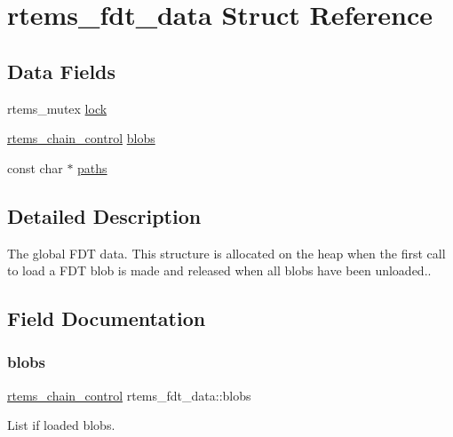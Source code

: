 \hypertarget{structrtems__fdt__data}{}\section{rtems\+\_\+fdt\+\_\+data Struct Reference}
\label{structrtems__fdt__data}
\subsection*{Data Fields}
\begin{DoxyCompactItemize}
\item 
rtems\+\_\+mutex \mbox{\hyperlink{structrtems__fdt__data_a66f9c0fa09d9122fec57cba894c7faed}{lock}}
\item 
\mbox{\hyperlink{unionChain__Control}{rtems\+\_\+chain\+\_\+control}} \mbox{\hyperlink{structrtems__fdt__data_abf0de674773b8f37eeb37f9224149b67}{blobs}}
\item 
const char $\ast$ \mbox{\hyperlink{structrtems__fdt__data_a70cb3b2729f46e1927255f89ee1b8885}{paths}}
\end{DoxyCompactItemize}


\subsection{Detailed Description}
The global F\+DT data. This structure is allocated on the heap when the first call to load a F\+DT blob is made and released when all blobs have been unloaded.. 

\subsection{Field Documentation}
\mbox{\label{structrtems__fdt__data_abf0de674773b8f37eeb37f9224149b67}} 
\subsubsection{\texorpdfstring{blobs}{blobs}}
{\footnotesize\ttfamily \mbox{\hyperlink{unionChain__Control}{rtems\+\_\+chain\+\_\+control}} rtems\+\_\+fdt\+\_\+data\+::blobs}

List if loaded blobs. \mbox{\label{structrtems__fdt__data_a66f9c0fa09d9122fec57cba894c7faed}} 
